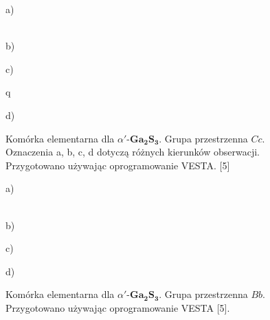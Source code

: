 \begin{enumerate}
	\begin{figure}[H]
		\begin{minipage}[h]{0.47\linewidth}
			 a) \\
		\end{minipage}
		\hfill
		\begin{minipage}[h]{0.47\linewidth}
			 \\b)
		\end{minipage}
		\vfill
		\begin{minipage}[h]{0.47\linewidth}
			 c) \\
		\end{minipage}q
		\hfill
		\begin{minipage}[h]{0.47\linewidth}
			 d) \\
		\end{minipage}
		\caption{Komórka elementarna dla $\alpha'$-$\mathbf{Ga_{2}S_{3}}$. Grupa przestrzenna $Cc$. Oznaczenia a, b, c, d dotyczą różnych kierunków obserwacji. Przygotowano używając oprogramowanie VESTA. [5]}
		\begin{minipage}[h]{0.47\linewidth}
			 a) \\
		\end{minipage}
		\hfill
		\begin{minipage}[h]{0.47\linewidth}
			 \\b)
		\end{minipage}
		\vfill
		\begin{minipage}[h]{0.47\linewidth}
			 c) \\
		\end{minipage}
		\hfill
		\begin{minipage}[h]{0.47\linewidth}
			 d) \\
		\end{minipage}
		\caption{Komórka elementarna dla $\alpha'$-$\mathbf{Ga_{2}S_{3}}$. Grupa przestrzenna $Bb$. Przygotowano używając oprogramowanie VESTA [5].}
	\end{figure}
	

\end{enumerate}
